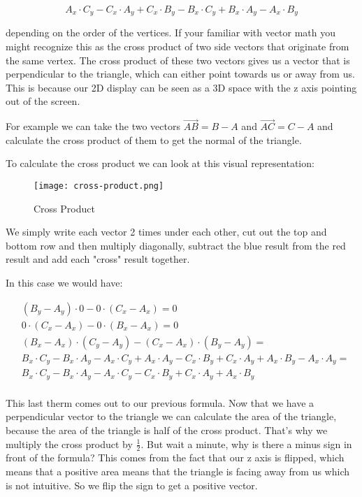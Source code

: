 \documentclass[12pt]{report} \usepackage{preamble}
\begin{document}
\[A_x \cdot C_y - C_x \cdot A_y + C_x \cdot B_y - B_x \cdot C_y + B_x \cdot A_y - A_x \cdot B_y\]

depending on the order of the vertices. If your familiar with vector math you might
recognize this as the cross product of two side vectors that originate from the same vertex.
The cross product of these two vectors gives us a vector that is perpendicular to the triangle,
which can either point towards us or away from us.
This is because our 2D display can be seen as a 3D space with the z axis pointing out of the screen.

For example we can take the two vectors \(\vec{AB} = B - A\) and \(\vec{AC} = C - A\)
and calculate the cross product of them to get the normal of the triangle.

To calculate the cross product we can look at this visual representation:

\begin{figure}[hbtp]
	\centering
	\texttt{[image: cross-product.png]}
	\caption{Cross Product} \FloatBarrier
\end{figure}

We simply write each vector 2 times under each other, cut out the top and bottom row
and then multiply diagonally, subtract the blue result from the red result
and add each "cross" result together.

In this case we would have:

\[
	\begin{aligned}
		 & (B_y - A_y) \cdot 0 - 0 \cdot (C_x - A_x) = 0                                                                                    \\
		 & 0 \cdot (C_x - A_x) - 0 \cdot (B_x - A_x) = 0                                                                                    \\
		 & (B_x - A_x) \cdot (C_y - A_y) - (C_x - A_x) \cdot (B_y - A_y) =                                                                  \\
		 & B_x \cdot C_y - B_x \cdot A_y - A_x \cdot C_y + A_x \cdot A_y - C_x \cdot B_y + C_x \cdot A_y + A_x \cdot B_y - A_x \cdot A_y  = \\
		 & B_x \cdot C_y - B_x \cdot A_y - A_x \cdot C_y - C_x \cdot B_y + C_x \cdot A_y + A_x \cdot B_y                                    \\
	\end{aligned}
\]

This last therm comes out to our previous formula.
Now that we have a perpendicular vector to the triangle we can calculate the area of the triangle,
because the area of the triangle is half of the cross product.
That's why we multiply the cross product by \(\frac{1}{2}\).
But wait a minute, why is there a minus sign in front of the formula?
This comes from the fact that our z axis is flipped, which means that a positive area
means that the triangle is facing away from us which is not
intuitive. So we flip the sign to get a positive vector.
\end{document}
